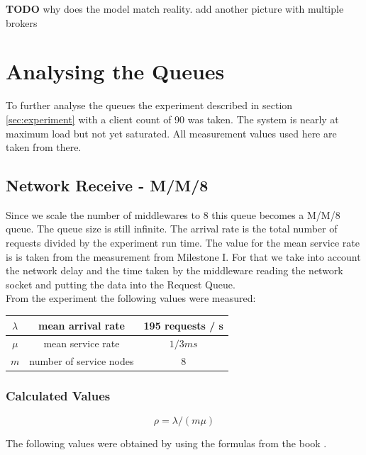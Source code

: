 \documentclass[a4paper]{article}
\begin{document}
\textbf{TODO} why does the model match reality. add another picture with multiple brokers


\section{Analysing the Queues}

To further analyse the queues the experiment described in section \ref{sec:experiment} with a client count of 90 was taken. The system is nearly at maximum load but not yet saturated. All measurement values used here are taken from there.

\subsection{Network Receive - M/M/8}
\label{sub:QueueNwReceive}

Since we scale the number of middlewares to 8 this queue becomes a M/M/8 queue. The queue size is still infinite. The arrival rate is the total number of requests divided by the experiment run time. The value for the mean service rate is is taken from the measurement from Milestone I. For that we take into account the network delay and the time taken by the middleware reading the network socket and putting the data into the Request Queue.\\


From the experiment the following values were measured:

\begin{tabular}{|c|c|c|}
\hline 
$\lambda$ & mean arrival rate & 195 requests / s \\ 
\hline 
$\mu$ & mean service rate & ${1 / {3ms}}$\\ 
\hline 
$m$ & number of service nodes & 8 \\ 
\hline 
\end{tabular} 

\subsubsection{Calculated Values}
\begin{equation}
\label{eq:TraficIntensity}
\rho = \lambda / (m \mu)
\end{equation}


The following values were obtained by using the formulas from the book \cite[Box 31.2]{Raj}.\\
\end{document}
